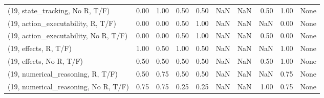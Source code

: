 \begin{table*}[h!]
\begin{adjustbox}{width=2\columnwidth,center}
\begin{tabular}{lrrr|rrr|rrr}
(19, state\_tracking, No R, T/F)       &                      0.00 &                  1.00 &                      0.50 &                          0.50 &                       NaN &                           NaN &                                   0.50 &                               1.00 &                                  None \\
(19, action\_executability, R, T/F)    &                      0.00 &                  0.00 &                      0.50 &                          1.00 &                       NaN &                           NaN &                                    NaN &                               0.00 &                                  None \\
(19, action\_executability, No R, T/F) &                      0.00 &                  0.00 &                      0.50 &                          1.00 &                       NaN &                           NaN &                                   0.50 &                               0.00 &                                  None \\
(19, effects, R, T/F)                 &                      1.00 &                  0.50 &                      1.00 &                          0.50 &                       NaN &                           NaN &                                    NaN &                               1.00 &                                  None \\
(19, effects, No R, T/F)              &                      0.50 &                  0.50 &                      0.50 &                          0.50 &                       NaN &                           NaN &                                   0.50 &                               1.00 &                                  None \\
(19, numerical\_reasoning, R, T/F)     &                      0.50 &                  0.75 &                      0.50 &                          0.50 &                       NaN &                           NaN &                                    NaN &                               0.75 &                                  None \\
(19, numerical\_reasoning, No R, T/F)  &                      0.75 &                  0.75 &                      0.25 &                          0.25 &                       NaN &                           NaN &                                   1.00 &                               0.75 &                                  None \\

\end{tabular}
\end{adjustbox}
\end{table*}
